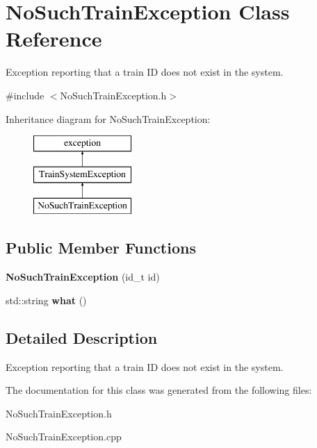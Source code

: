 \hypertarget{classNoSuchTrainException}{}\section{No\+Such\+Train\+Exception Class Reference}
\label{classNoSuchTrainException}


Exception reporting that a train ID does not exist in the system.  




{\ttfamily \#include $<$No\+Such\+Train\+Exception.\+h$>$}

Inheritance diagram for No\+Such\+Train\+Exception\+:\begin{figure}[H]
\begin{center}
\leavevmode
\includegraphics[height=3.000000cm]{classNoSuchTrainException}
\end{center}
\end{figure}
\subsection*{Public Member Functions}
\begin{DoxyCompactItemize}
\item 
\mbox{\label{classNoSuchTrainException_ae60439498bd6e552159ed1c50335daba}} 
{\bfseries No\+Such\+Train\+Exception} (id\+\_\+t id)
\item 
\mbox{\label{classNoSuchTrainException_a812ae27b54620f59e0a9e23969935099}} 
std\+::string {\bfseries what} ()
\end{DoxyCompactItemize}


\subsection{Detailed Description}
Exception reporting that a train ID does not exist in the system. 

The documentation for this class was generated from the following files\+:\begin{DoxyCompactItemize}
\item 
No\+Such\+Train\+Exception.\+h\item 
No\+Such\+Train\+Exception.\+cpp\end{DoxyCompactItemize}
